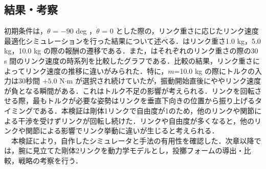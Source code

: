 \subsection{結果・考察}
初期条件は，$\theta$ = $-90$ deg ，$\dot{\theta}$ = 0 とした際の，リンク重さに応じたリンク速度最適化シミュレーションを行った結果について述べる．はリンク重さ1.0 kg，5.0 kg，10.0 kg の際の報酬の遷移である．また，はそれぞれのリンク重さの際の30 s 間のリンク速度の時系列を比較したグラフである．比較の結果，リンク重さによってリンク速度の推移に違いがみられた．特に，$m$=10.0 kg の際にトルクの入力は30秒間 $+ 5.0$ N$\cdot$m が選択され続けていたが，振動開始直後にややリンク速度が負となる瞬間がある．これはトルク不足の影響が考えられる．リンクを回転させる際，最もトルクが必要な姿勢はリンクを垂直下向きの位置から振り上げるタイミングである．本検証は剛体1リンクで自由度が1のため，他のリンクや関節による干渉を受けずリンクが回転し続けた．リンクや自由度が多くなると，他のリンクや関節による影響でリンク挙動に違いが生じると考えられる．\\
　本検証により，自作したシミュレータと手法の有用性を確認した．次章以降では，腕に見立てた剛体2リンクを動力学モデルとし，投擲フォームの導出・比較，戦略の考察を行う．

